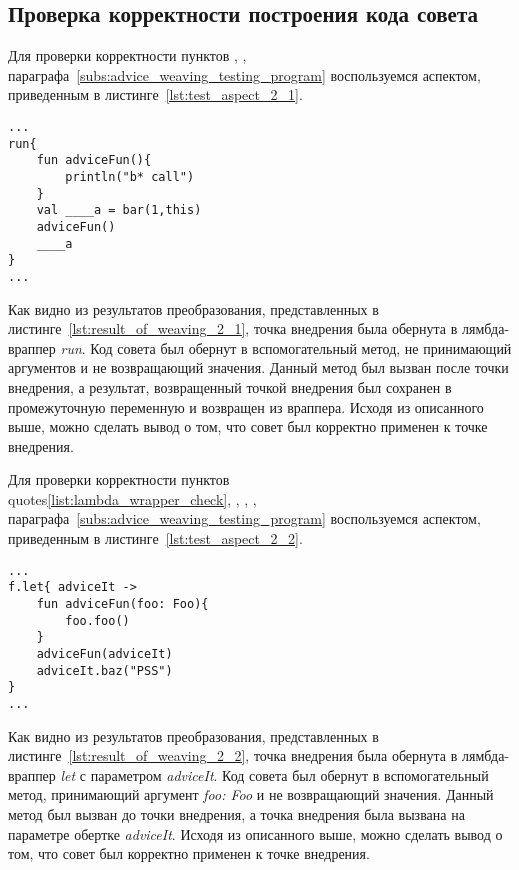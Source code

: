 \subsection{Проверка корректности построения кода совета}
\label{sub:advice_code_building_tests}
Для проверки корректности пунктов \quotes{\ref{list:lambda_wrapper_check}},
\quotes{\ref{list:buffer_method_check}},
\quotes{\ref{list:pointcut_call_check}} параграфа~\ref{subs:advice_weaving_testing_program} воспользуемся аспектом, приведенным в листинге~\ref{lst:test_aspect_2_1}.
\begin{lstlisting}[style={java}, label={lst:result_of_weaving_2_1},
 caption={Результат применения аспекта, описанного в листинге~\ref{lst:test_aspect_2_1}, к тестовой программе}]
...
run{
	fun adviceFun(){
        println("b* call")
    }
	val ____a = bar(1,this)
	adviceFun()
	____a
}
...
\end{lstlisting}
Как видно из результатов преобразования, представленных в листинге~\ref{lst:result_of_weaving_2_1}, точка внедрения была обернута в лямбда-враппер \textit{run}.
Код совета был обернут в вспомогательный метод, не принимающий аргументов и не возвращающий значения.
Данный метод был вызван после точки внедрения, а результат, возвращенный точкой внедрения был сохранен в промежуточную переменную и возвращен из враппера.
Исходя из описанного выше, можно сделать вывод о том, что совет был корректно применен к точке внедрения.

Для проверки корректности пунктов \\quotes{\ref{list:lambda_wrapper_check}},
\quotes{\ref{list:buffer_method_check}},
\quotes{\ref{list:buffer_method_call_check}},
\quotes{\ref{list:pointcut_call_check}},
\quotes{\ref{list:target_use_check}} параграфа~\ref{subs:advice_weaving_testing_program} воспользуемся аспектом, приведенным в листинге~\ref{lst:test_aspect_2_2}.
\begin{lstlisting}[style={java}, label={lst:result_of_weaving_2_2},
 caption={Результат применения аспекта, описанного в листинге~\ref{lst:test_aspect_2_2}, к тестовой программе}]
...
f.let{ adviceIt ->
	fun adviceFun(foo: Foo){
    	foo.foo()
    }
	adviceFun(adviceIt)
	adviceIt.baz("PSS")
}
...
\end{lstlisting}
Как видно из результатов преобразования, представленных в листинге~\ref{lst:result_of_weaving_2_2}, точка внедрения была обернута в лямбда-враппер \textit{let} с параметром \textit{adviceIt}.
Код совета был обернут в вспомогательный метод, принимающий аргумент \textit{foo: Foo} и не возвращающий значения.
Данный метод был вызван до точки внедрения, а точка внедрения была вызвана на параметре обертке \textit{adviceIt}.
Исходя из описанного выше, можно сделать вывод о том, что совет был корректно применен к точке внедрения.
